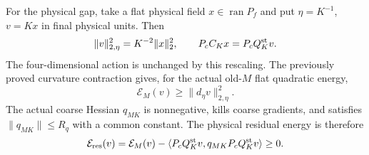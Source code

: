 \documentclass[11pt]{article}
\theoremstyle{remark}
\begin{document}
For the physical gap, take a flat physical field $x\in\operatorname{ran}P_f$
and put $\eta=K^{-1}$, $v=Kx$ in final physical units. Then
\begin{equation}
 \|v\|_{2,\eta}^2=K^{-2}\|x\|_2^2,\qquad
 P_cC_Kx=P_cQ_K^{\rm st}v.\label{pqd-flat-scaling}
\end{equation}
The four-dimensional action is unchanged by this rescaling. The
previously proved curvature contraction gives, for the actual old-$M$
flat quadratic energy,
\begin{equation}
 \mathcal E_M(v)\ge\|d_\eta v\|_{2,\eta}^2.
 \label{pqd-maxwell-lower}
\end{equation}
The actual coarse Hessian $q_{MK}$ is nonnegative, kills coarse
gradients, and satisfies $\|q_{MK}\|\le R_q$ with a common constant.
The physical residual energy is therefore
\begin{equation}
 \mathcal E_{\rm res}(v)=\mathcal E_M(v)
  -\langle P_cQ_K^{\rm st}v,q_{MK}P_cQ_K^{\rm st}v\rangle\ge0.
 \label{pqd-flat-residual}
\end{equation}
\end{document}
